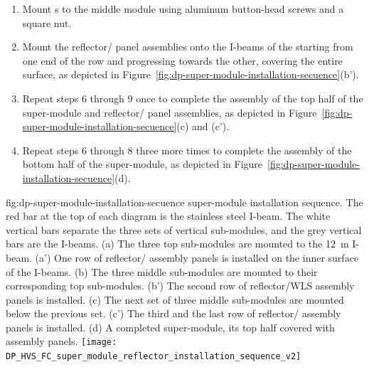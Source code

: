 \begin{enumerate}
    \item Mount s to the middle module using aluminum button-head screws and a square nut. 
   \item %
   Mount the  reflector/ panel assemblies onto the  I-beams of the  
   starting from one end of the row and progressing towards the other, covering the entire surface, as depicted in Figure~\ref{fig:dp-super-module-installation-secuence}(b'). 
   
    \item Repeat steps \num{6} through \num{9} %
    once to complete the assembly of the top half of the super-module %
    and  reflector/ panel assemblies, as depicted in Figure~\ref{fig:dp-super-module-installation-secuence}(c) and (c').
    \item Repeat steps \num{6} through \num{8} %
    three more times to complete the assembly of the %
    bottom half of the super-module, as depicted in Figure~\ref{fig:dp-super-module-installation-secuence}(d).
\end{enumerate}

\begin{dunefigure}
{fig:dp-super-module-installation-secuence}
{ super-module installation sequence. The red bar at the top of each diagram is the stainless steel I-beam. The white vertical bars separate the three sets of vertical sub-modules, and the grey vertical bars are the  I-beams. (a) The three top sub-modules are mounted to the \SI{12}{\m} I-beam. %
(a') One row of  reflector/ assembly panels is installed on the inner surface of the   I-beams.  
(b) The three middle sub-modules are mounted to their corresponding top sub-modules.
(b') The second row of  reflector/WLS assembly panels is installed. %
(c) The next set of three middle sub-modules are mounted below the previous set. %
(c') The third and the last row of  reflector/ assembly panels is installed. %
(d) A completed super-module, %
its top half %
covered with  %
assembly panels.}
\texttt{[image: DP\_HVS\_FC\_super\_module\_reflector\_installation\_sequence\_v2]}
\end{dunefigure}

